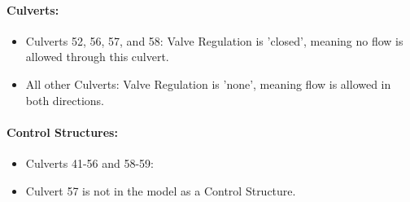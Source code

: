 \paragraph{Culverts:}

\begin{itemize}

\item Culverts \textcolor[rgb]{1.00,0.00,0.00}{52, 56}, 57, and \textcolor[rgb]{1.00,0.00,0.00}{58}: Valve Regulation is 'closed', meaning no flow is allowed through this culvert.

\item All other Culverts: Valve Regulation is 'none', meaning flow is allowed in both directions.


\end{itemize}

\paragraph{Control Structures:}

\begin{itemize}

\item Culverts 41-56 and 58-59:


\item Culvert 57 is not in the model as a Control Structure.

\end{itemize}

